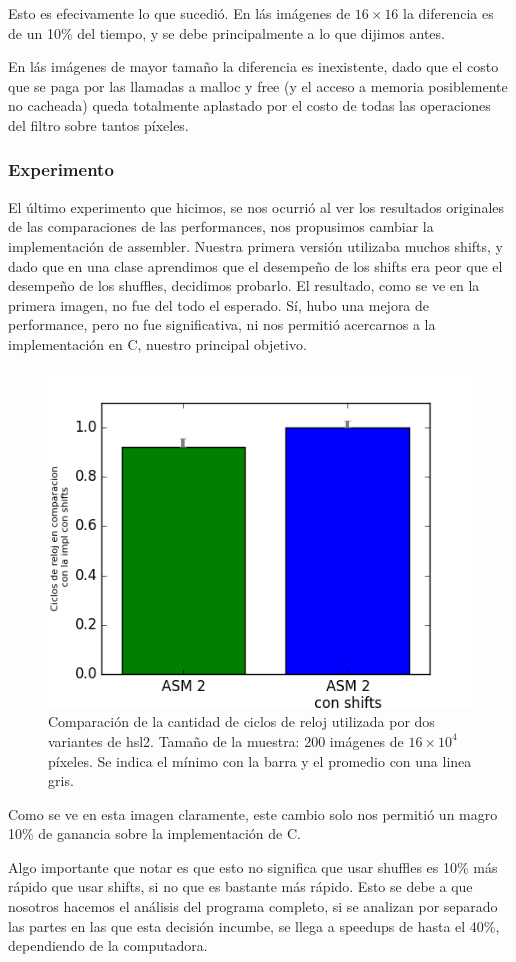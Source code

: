 Esto es efecivamente lo que sucedió. En lás imágenes de $16 \times 16$ la diferencia es de un 10\% del tiempo, y se debe principalmente a lo que dijimos antes.

En lás imágenes de mayor tamaño la diferencia es inexistente, dado que el costo que se paga por las llamadas a malloc y free (y el acceso a memoria posiblemente no cacheada) queda totalmente aplastado por el costo de todas las operaciones del filtro sobre tantos píxeles.


\subsubsection*{Experimento}
El último experimento que hicimos, se nos ocurrió al ver los resultados originales de las comparaciones de las performances, nos propusimos cambiar la implementación de assembler. Nuestra primera versión utilizaba muchos shifts, y dado que en una clase aprendimos que el desempeño de los shifts era peor que el desempeño de los shuffles, decidimos probarlo. El resultado, como se ve en la primera imagen, no fue del todo el esperado. Sí, hubo una mejora de performance, pero no fue significativa, ni nos permitió acercarnos a la implementación en C, nuestro principal objetivo.


\begin{figure}[H] 
	\centering
  \includegraphics[scale=0.7]{images/hsl-shsh.png}
  \caption{Comparación de la cantidad de ciclos de reloj utilizada por dos variantes de hsl2. Tamaño de la muestra: 200 imágenes de $16 \times 10^4$ píxeles. Se indica el mínimo con la barra y el promedio con una linea gris.}
\end{figure}

Como se ve en esta imagen claramente, este cambio solo nos permitió un magro 10\% de ganancia sobre la implementación de C.

Algo importante que notar es que esto no significa que usar shuffles es 10\% más rápido que usar shifts, si no que es bastante más rápido. Esto se debe a que nosotros hacemos el análisis del programa completo, si se analizan por separado las partes en las que esta decisión incumbe, se llega a speedups de hasta el 40\%, dependiendo de la computadora.
\\




